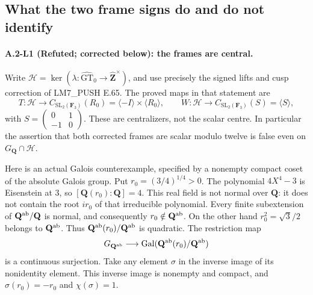 
\subsection{What the two frame signs do and do not identify}

\paragraph{A.2-L1 (Refuted; corrected below): the frames are central.}
Write $\mathcal H=\ker(\lambda:\widehat{\mathrm{GT}}_0\to
\widehat{\mathbf Z}^{\times})$, and use precisely the signed lifts and
cusp correction of LM7\_PUSH E.65.  The proved maps in that statement are
\[
 T:\mathcal H\longrightarrow
 C_{\mathrm{SL}_2(\mathbf F_3)}(R_0)
 =\langle-I\rangle\times\langle R_0\rangle,
 \qquad
 W:\mathcal H\longrightarrow
 C_{\mathrm{SL}_2(\mathbf F_3)}(S)=\langle S\rangle,
\]
with $S=\left(\begin{smallmatrix}0&1\\-1&0\end{smallmatrix}\right)$.
These are centralizers, not the scalar centre.  In particular the assertion
that both corrected frames are scalar modulo twelve is false even on
$G_{\mathbf Q}\cap\mathcal H$.

Here is an actual Galois counterexample, specified by a nonempty compact
coset of the absolute Galois group.  Put $r_0=(3/4)^{1/4}>0$.
The polynomial $4X^4-3$ is Eisenstein at $3$, so
$[\mathbf Q(r_0):\mathbf Q]=4$.  This real field is not normal over
$\mathbf Q$: it does not contain the root $ir_0$ of that irreducible
polynomial.  Every finite subextension of $\mathbf Q^{\rm ab}/\mathbf Q$
is normal, and consequently $r_0\notin\mathbf Q^{\rm ab}$.
On the other hand $r_0^2=\sqrt3/2$ belongs to $\mathbf Q^{\rm ab}$.
Thus $\mathbf Q^{\rm ab}(r_0)/\mathbf Q^{\rm ab}$ is quadratic.
The restriction map
\[
 G_{\mathbf Q^{\rm ab}}\longrightarrow
 \operatorname{Gal}(\mathbf Q^{\rm ab}(r_0)/\mathbf Q^{\rm ab})
\]
is a continuous surjection.  Take any element $\sigma$ in the inverse
image of its nonidentity element.  This inverse image is nonempty and
compact, and $\sigma(r_0)=-r_0$ and $\chi(\sigma)=1$.

